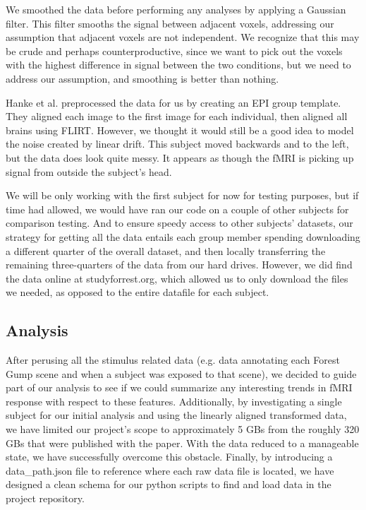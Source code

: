 \documentclass[11pt]{article}
\begin{document}
We smoothed the data before performing any analyses by applying a Gaussian
filter.  This filter smooths the signal between adjacent voxels, addressing
our assumption that adjacent voxels are not independent.  We recognize that
this may be crude and perhaps counterproductive, since we want to pick out the
voxels with the highest difference in signal between the two conditions, but
we need to address our assumption, and smoothing is better than nothing.

Hanke et al. preprocessed the data for us by creating an EPI group template.
They aligned each image to the first image for each individual, then aligned
all brains using FLIRT.  However, we thought it would still be a good idea to
model the noise created by linear drift.  This subject moved backwards and to
the left, but the data does look quite messy.  It appears as though the fMRI
is picking up signal from outside the subject’s head.

We will be only working with the first subject for now for testing purposes,
but if time had allowed, we would have ran our code on a couple of other
subjects for comparison testing. And to ensure speedy access to other
subjects' datasets, our strategy for getting all the data entails each group
member spending downloading a different quarter of the overall dataset, and
then locally transferring the remaining three-quarters of the data from our
hard drives.  However, we did find the data online at studyforrest.org, which
allowed us to only download the files we needed, as opposed to the entire
datafile for each subject.


\subsection{Analysis} After perusing all the stimulus related data (e.g. data
annotating each Forest Gump scene and when a subject was exposed to that
scene), we decided to guide part of our analysis to see if we could summarize
any interesting trends in fMRI response with respect to these features.
Additionally, by investigating a single subject for our initial analysis  and
using the linearly aligned transformed data, we have limited our project’s
scope to approximately 5 GBs from the roughly 320 GBs that were published with
the paper. With the data reduced to a manageable state, we have successfully
overcome this obstacle. Finally, by introducing a data\_path.json file to
reference where each raw data file is located, we have designed a clean schema
for our python scripts to find and load data in the project repository.
\end{document}
